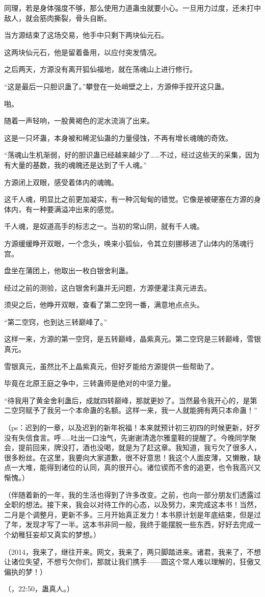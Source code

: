 \begin{this_body}
同理，若是身体强度不够，那么使用力道蛊虫就要小心。一旦用力过度，还未打中敌人，就会筋肉撕裂，骨头自断。

当方源结束了这场交易，他手中只剩下两块仙元石。

这两块仙元石，他是留着备用，以应付突发情况。

之后两天，方源没有离开狐仙福地，就在荡魂山上进行修行。

“这是最后一只胆识蛊了。”攀登在一处峭壁之上，方源伸手捏开这只蛊。

啪。

随着一声轻响，一股黄褐色的泥水流淌了出来。

这是一只坏蛊，本身被和稀泥仙蛊的力量侵蚀，不再有增长魂魄的奇效。

“荡魂山生机渐弱，好的胆识蛊已经越来越少了……不过，经过这些天的采集，因为有大量的基数，我的魂魄还是达到了千人魂。”

方源闭上双眼，感受着体内的魂魄。

这千人魂，明显比之前更加凝实，有一种沉甸甸的错觉。它像是被硬塞在方源的身体内，有一种要满溢冲出来的感觉。

千人魂，是奴道高手的标志之一。当初的常山阴，就有千人魂。

方源缓缓睁开双眼，一个念头，唤来小狐仙，令其立刻挪移进了山体内的荡魂行宫。

盘坐在蒲团上，他取出一枚白银舍利蛊。

经过之前的测验，这白银舍利蛊并无问题，方源便灌注真元进去。

须臾之后，他睁开双眼，查看了第二空窍一番，满意地点点头。

“第二空窍，也到达三转巅峰了。”

这样一来，方源的第一空窍，是五转巅峰，晶紫真元。第二空窍是三转巅峰，雪银真元。

雪银真元，虽然比不上晶紫真元，但好歹能给方源提供一些帮助了。

毕竟在北原王庭之争中，三转蛊师是绝对的中坚力量。

“待我用了黄金舍利蛊后，成就四转巅峰，那就更妙了。当然最令我开心的，是第二空窍赋予了我另一个本命蛊的名额。这样一来，我一人就能拥有两只本命蛊！”

（ps：迟到的一章，以及迟到的新年祝福！本来就预计初三初四的时候更新，好歹没有失信食言。呼……吐出一口浊气，先谢谢清逸尔雅童鞋的提醒了。今晚同学聚会，提前回来，牌没打，酒也没喝，就是为了赶这章。我知道，我亏欠了很多人，很多粉丝。在这里，我要向大家道歉，很不好意思！我这个人面皮薄，又懒散，缺点一大堆，能得到诸位的认同，真的很开心。诸位锲而不舍的追更，也令我高兴又惭愧。）

（伴随着新的一年，我的生活也得到了许多改变。之前，也向一部分朋友们透露过全职的想法。接下来，我会以对待工作的心态，以及努力，来完成这本书！当然，二月是个调整月，更新不多。三月开始真正发力！本书原计划是年底结束，但是过了年，发现才写了一半。这本书非同一般，我终于能摆脱一些东西，好好去完成一个幼稚狂妄却又真实的梦想。）

（2014，我来了，继往开来。网文，我来了，两只脚踏进来。诸君，我来了，不想让诸位失望，不想亏欠你们，那就让我们携手——圆这个常人难以理解的，狂傲又偏执的梦！）

（，22:50，蛊真人。）

\end{this_body}

